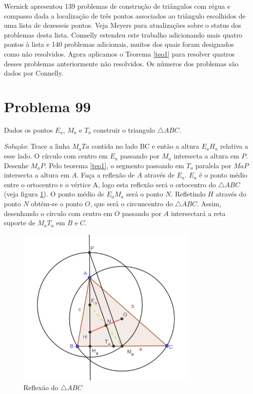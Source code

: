 \documentclass[12pt, openright, a4paper, brazil, openany, oneside]{abntex2}
\begin{document}
Wernick\cite{Wernick} apresentou 139 problemas de construção de triângulos com régua e compasso dada a localização de três pontos associados ao triângulo escolhidos de uma lista de dezesseis pontos. Veja Meyers\cite{Meyers} para atualizações sobre o status dos problemas desta lista. Connelly \cite{con} estendeu este trabalho adicionando mais quatro pontos à lista e 140 problemas adicionais, muitos dos quais foram designados como não resolvidos. Agora aplicamos o Teorema \ref{teo1} para resolver quatros desses problemas anteriormente não resolvidos. Os números dos problemas são dados por Connelly.

\section{Problema 99}

Dados os pontos $E_a$, $M_a$ e $T_a$ construir o triangulo $\triangle ABC$.

\textit{Solução}: Trace a linha $M_{a}T{a}$ contida no lado BC e então a altura $E_{a}H_{a}$ relativa a esse lado. O círculo com centro em $E_{a}$ passando por $M_{a}$ intersecta a altura em $P$. Desenhe $M_{a}P$. Pelo teorema \ref{teo1}, o segmento passando em $T_{a}$ paralela por $M{a}P$ intersecta a altura em $A$. Faça a reflexão de $A$ através de $E_{a}$. $E_{a}$ é o ponto médio entre o ortocentro e o vértice A, logo esta reflexão será o ortocentro do $\triangle ABC$ (veja figura \ref{trianexer}). O ponto médio de $E_{a}M_{a}$ será o ponto $N$. Refletindo $H$ através do ponto $N$ obtém-se o ponto $O$, que será o circuncentro do $\triangle ABC$. Assim, desenhando o círculo com centro em $O$ passando por $A$ intersectará a reta suporte de $M_{a}T_{a}$ em $B$ e $C$. 

\begin{figure}[h]
	
	\center
	
	\includegraphics[width=9cm]{triangexer.png}
	\caption{Reflexão do $\triangle ABC$ \label{trianexer}}
	
\end{figure}
\end{document}
